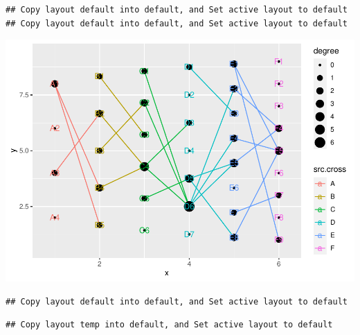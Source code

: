 \documentclass[
]{article}
\newenvironment{Shaded}{\begin{snugshade}}{\end{snugshade}}
\newcommand{\CommentTok}[1]{\textcolor[rgb]{0.56,0.35,0.01}{\textit{#1}}}
\newcommand{\KeywordTok}[1]{\textcolor[rgb]{0.13,0.29,0.53}{\textbf{#1}}}
\newcommand{\NormalTok}[1]{#1}
\newcommand{\OperatorTok}[1]{\textcolor[rgb]{0.81,0.36,0.00}{\textbf{#1}}}
\newcommand{\StringTok}[1]{\textcolor[rgb]{0.31,0.60,0.02}{#1}}
\begin{document}
\begin{Shaded}
\end{Shaded}

\begin{verbatim}
## Copy layout default into default, and Set active layout to default
## Copy layout default into default, and Set active layout to default
\end{verbatim}

\includegraphics{ReadMe1_files/figure-latex/unnamed-chunk-7-2.pdf}

\begin{Shaded}
\end{Shaded}

\begin{verbatim}
## Copy layout default into default, and Set active layout to default
\end{verbatim}

\begin{verbatim}
## Copy layout temp into default, and Set active layout to default
\end{verbatim}
\end{document}
